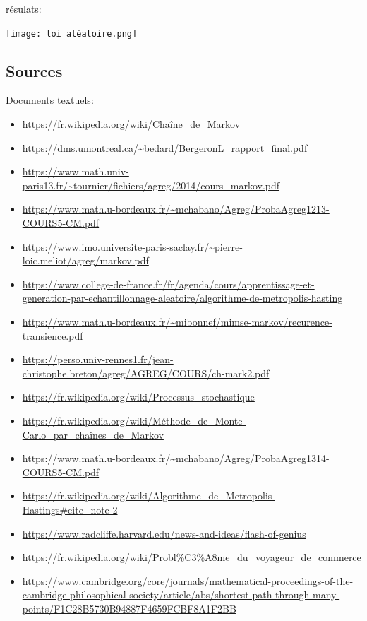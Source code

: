 \documentclass{article}
\begin{document}
résulats:

\texttt{[image: loi aléatoire.png]}


















\newpage

\subsection{Sources}



Documents textuels:
\begin{itemize}
    \item \url{https://fr.wikipedia.org/wiki/Chaîne_de_Markov}
    \item \url{https://dms.umontreal.ca/~bedard/BergeronL_rapport_final.pdf}
    \item \url{https://www.math.univ-paris13.fr/~tournier/fichiers/agreg/2014/cours_markov.pdf}
    \item \url{https://www.math.u-bordeaux.fr/~mchabano/Agreg/ProbaAgreg1213-COURS5-CM.pdf}
    \item \url{https://www.imo.universite-paris-saclay.fr/~pierre-loic.meliot/agreg/markov.pdf}
    \item \url{https://www.college-de-france.fr/fr/agenda/cours/apprentissage-et-generation-par-echantillonnage-aleatoire/algorithme-de-metropolis-hasting}
    \item \url{https://www.math.u-bordeaux.fr/~mibonnef/mimse-markov/recurence-transience.pdf}
    \item \url{https://perso.univ-rennes1.fr/jean-christophe.breton/agreg/AGREG/COURS/ch-mark2.pdf}
    \item \url{https://fr.wikipedia.org/wiki/Processus_stochastique}
    \item \url{https://fr.wikipedia.org/wiki/Méthode_de_Monte-Carlo_par_chaînes_de_Markov}
    \item \url{https://www.math.u-bordeaux.fr/~mchabano/Agreg/ProbaAgreg1314-COURS5-CM.pdf} \\
    \item \url{https://fr.wikipedia.org/wiki/Algorithme_de_Metropolis-Hastings#cite_note-2}
    \item \url{https://www.radcliffe.harvard.edu/news-and-ideas/flash-of-genius} \\
    \item \url{https://fr.wikipedia.org/wiki/Probl\%C3\%A8me_du_voyageur_de_commerce}
    \item \url{https://www.cambridge.org/core/journals/mathematical-proceedings-of-the-cambridge-philosophical-society/article/abs/shortest-path-through-many-points/F1C28B5730B94887F4659FCBF8A1F2BB} %
\end{itemize}
\end{document}
